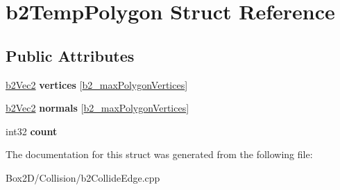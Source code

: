 \hypertarget{structb2_temp_polygon}{}\section{b2\+Temp\+Polygon Struct Reference}
\label{structb2_temp_polygon}
\subsection*{Public Attributes}
\begin{DoxyCompactItemize}
\item 
\mbox{\label{structb2_temp_polygon_a7351a98f6052d1fce66e11bfc5b98a3a}} 
\hyperlink{structb2_vec2}{b2\+Vec2} {\bfseries vertices} \mbox{[}\hyperlink{b2_settings_8h_a09d71ee1993bee28b5b2e6d893b41884}{b2\+\_\+max\+Polygon\+Vertices}\mbox{]}
\item 
\mbox{\label{structb2_temp_polygon_a45b9db5dcbcb66170029e9a2f524fc6a}} 
\hyperlink{structb2_vec2}{b2\+Vec2} {\bfseries normals} \mbox{[}\hyperlink{b2_settings_8h_a09d71ee1993bee28b5b2e6d893b41884}{b2\+\_\+max\+Polygon\+Vertices}\mbox{]}
\item 
\mbox{\label{structb2_temp_polygon_a5b08379f676f8498190c398d9ec3d0a5}} 
int32 {\bfseries count}
\end{DoxyCompactItemize}


The documentation for this struct was generated from the following file\+:\begin{DoxyCompactItemize}
\item 
Box2\+D/\+Collision/b2\+Collide\+Edge.\+cpp\end{DoxyCompactItemize}
